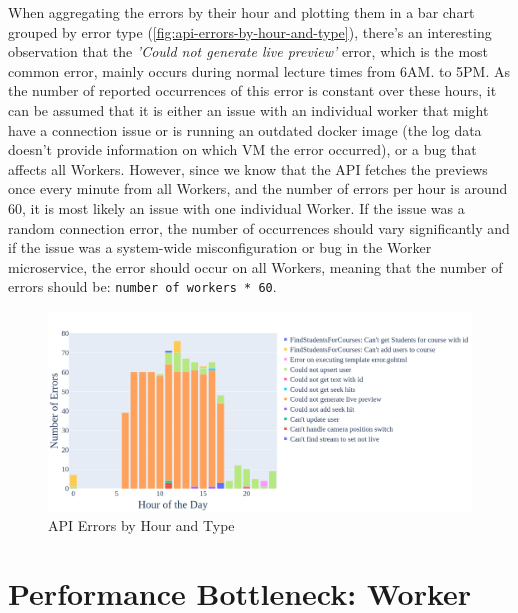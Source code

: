 When aggregating the errors by their hour and plotting them in a bar chart grouped by error type (\autoref{fig:api-errors-by-hour-and-type}), there's an interesting observation that the \textit{'Could not generate live preview'} error, which is the most common error, mainly occurs during normal lecture times from 6AM. to 5PM. As the number of reported occurrences of this error is constant over these hours, it can be assumed that it is either an issue with an individual worker that might have a connection issue or is running an outdated docker image (the log data doesn't provide information on which \ac{VM} the error occurred), or a bug that affects all Workers. However, since we know that the \ac{API} fetches the previews once every minute from all Workers, and the number of errors per hour is around 60, it is most likely an issue with one individual Worker. If the issue was a random connection error, the number of occurrences should vary significantly and if the issue was a system-wide misconfiguration or bug in the Worker microservice, the error should occur on all Workers, meaning that the number of errors should be: \texttt{number of workers * 60}.     

\begin{figure}[htpb]
    \centering
    \includegraphics[width=\linewidth]{images/plots/api/errors_by_hour_and_type.png}
    \caption[\ac{API} Errors by Hour and Type]{\ac{API} Errors by Hour and Type}\label{fig:api-errors-by-hour-and-type}
\end{figure}


\section{Performance Bottleneck: Worker}

